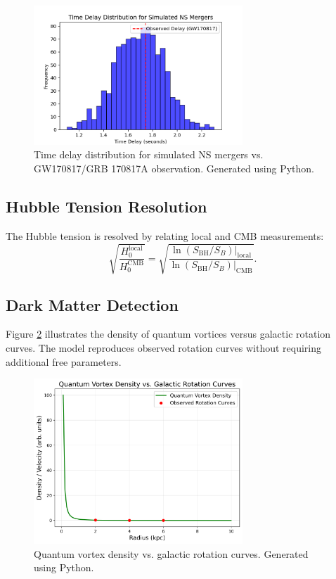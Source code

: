 \documentclass[12pt,a4paper]{article}
\begin{document}
\begin{figure}[h!]
\centering
\includegraphics[width=0.7\textwidth]{gw_grb_delay.png}
\caption{Time delay distribution for simulated NS mergers vs. GW170817/GRB 170817A observation. Generated using Python.}
\label{fig:gw_grb_delay}
\end{figure}

\subsection{Hubble Tension Resolution}
The Hubble tension is resolved by relating local and CMB measurements:
\[
\sqrt{\frac{H_0^{\text{local}}}{H_0^{\text{CMB}}}} = \sqrt{\frac{\ln(S_{\text{BH}}/S_B)|_{\text{local}}}{\ln(S_{\text{BH}}/S_B)|_{\text{CMB}}}}.
\]

\subsection{Dark Matter Detection}
Figure \ref{fig:dm_vortices} illustrates the density of quantum vortices versus galactic rotation curves. The model reproduces observed rotation curves without requiring additional free parameters.

\begin{figure}[h!]
\centering
\includegraphics[width=0.7\textwidth]{dm_vortices.png}
\caption{Quantum vortex density vs. galactic rotation curves. Generated using Python.}
\label{fig:dm_vortices}
\end{figure}
\end{document}
